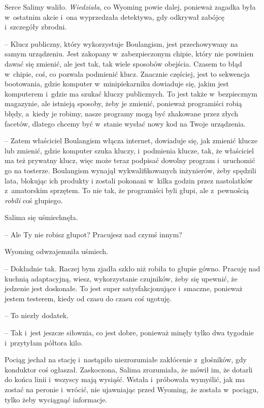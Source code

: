 \documentclass[oneside,polish,11pt,sfheadings]{mwbk}
\begin{document}
Serce Salimy waliło. \textit{Wiedziała}, co Wyoming powie dalej, ponieważ
zagadka była w~ostatnim akcie i~ona wyprzedzała detektywa, gdy odkrywał
zabójcę i~szczegóły zbrodni.

-- Klucz publiczny, który wykorzystuje Boulangism, jest przechowywany na
samym urządzeniu. Jest zakopany w~zabezpieczonym chipie, który nie
powinien dawać się zmienić, ale jest tak, tak wiele sposobów obejścia.
Czasem to błąd w~chipie, coś, co pozwala podmienić klucz. Znacznie
częściej, jest to sekwencja bootowania, gdzie komputer w~minipiekarniku
dowiaduje się, jakim jest komputerem i~gdzie ma szukać kluczy
publicznych. To jest także w~bezpiecznym magazynie, ale istnieją
sposoby, żeby je zmienić, ponieważ programiści robią błędy, a~kiedy je
robimy, nasze programy mogą być zhakowane przez złych facetów, dlatego
chcemy być w~stanie wysłać nowy kod na Twoje urządzenia.

-- Zatem właściciel Boulangism włącza internet, dowiaduje się, jak
zmienić klucze lub zmienić, gdzie komputer szuka kluczy, i~podmienia
klucze, tak, że właściciel ma też prywatny klucz, więc może teraz
podpisać dowolny program i~uruchomić go na tosterze. Boulangism wynajął
wykwalifikowanych inżynierów, żeby spędzili lata, blokując ich produkty
i zostali pokonani w~kilka godzin przez nastolatków z~amatorskim
sprzętem. To nie tak, że programiści byli głupi, ale z~pewnością
\textit{robili} coś głupiego.

Salima się uśmiechnęła.

 -- Ale Ty nie robisz głupot? Pracujesz nad czymś
innym?

Wyoming odwzajemniła uśmiech. 

-- Dokładnie tak. Raczej bym zjadła szkło
niż robiła to głupie gówno. Pracuję nad kuchnią adaptacyjną, wiesz,
wykorzystanie czujników, żeby się upewnić, że jedzenie jest doskonałe.
To jest super satysfakcjonujące i~smaczne, ponieważ jestem testerem,
kiedy od czasu do czasu coś ugotuję.

-- To niezły dodatek.

-- Tak i~jest jeszcze siłownia, co jest dobre, ponieważ minęły tylko dwa
tygodnie i~przytyłam półtora kilo.

Pociąg jechał na stację i~nastąpiło niezrozumiałe zakłócenie z~głośników, gdy konduktor coś ogłaszał. Zaskoczona, Salima zrozumiała, że
mówił im, że dotarli do końca linii i~wszyscy mają wysiąść. Wstała i~próbowała wymyślić, jak ma zostać na peronie i~wrócić, nie ujawniając
przed Wyoming, że została w~pociągu, tylko żeby wyciągnąć informacje.
\end{document}
